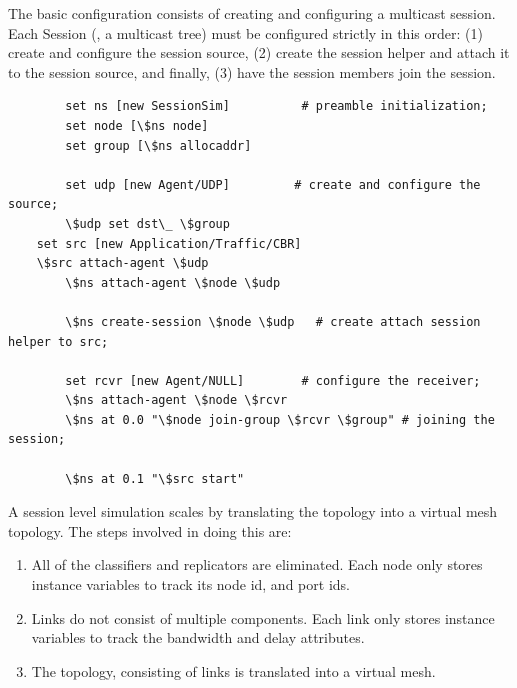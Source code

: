 The basic configuration consists of creating and configuring
a  multicast session.
Each Session (\ie, a multicast tree) must be configured strictly in
this order:
(1) create and configure the session source,
(2) create the session helper and attach it to the session source, and
finally, (3) have the session members join the session.
\begin{verbatim}
        set ns [new SessionSim]          # preamble initialization;
        set node [\$ns node]    
        set group [\$ns allocaddr]

        set udp [new Agent/UDP]         # create and configure the source;
        \$udp set dst\_ \$group
	set src [new Application/Traffic/CBR]
	\$src attach-agent \$udp
        \$ns attach-agent \$node \$udp

        \$ns create-session \$node \$udp   # create attach session helper to src;

        set rcvr [new Agent/NULL]        # configure the receiver;
        \$ns attach-agent \$node \$rcvr
        \$ns at 0.0 "\$node join-group \$rcvr \$group" # joining the session;

        \$ns at 0.1 "\$src start"
\end{verbatim}
A session level simulation scales by translating the topology
into a virtual mesh topology.
The steps involved in doing this are:
\begin{enumerate}\itemsep0pt
\item All of the classifiers and replicators are eliminated.
  Each node only stores instance variables to track its node id, and port ids.
\item Links do not consist of multiple components.
  Each link only stores instance variables to track the bandwidth and delay attributes.
\item The topology, consisting of links is translated into a virtual mesh.
\end{enumerate}
